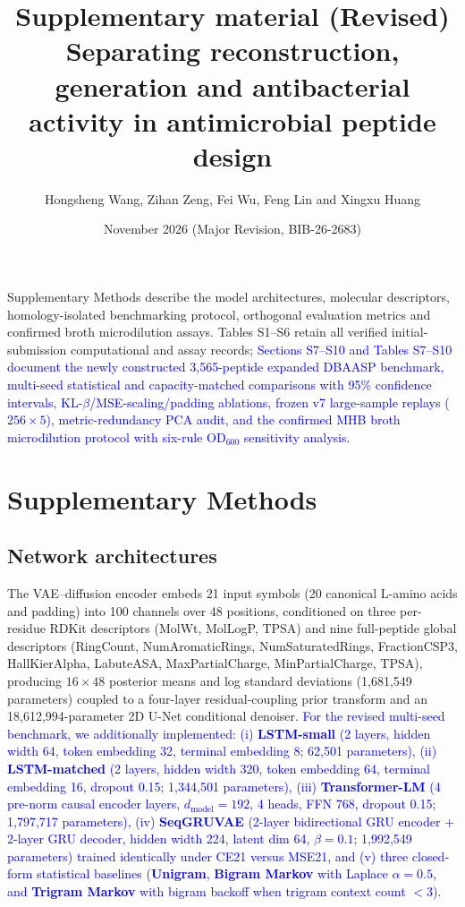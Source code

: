 \documentclass[11pt,a4paper]{article}
\title{Supplementary material (Revised)\\[5pt]\large Separating reconstruction, generation and antibacterial activity in antimicrobial peptide design}
\author{Hongsheng Wang, Zihan Zeng, Fei Wu, Feng Lin and Xingxu Huang}
\date{November 2026 (Major Revision, BIB-26-2683)}
\newcommand{\rev}[1]{\textcolor{blue}{#1}}
\begin{document}
\maketitle\thispagestyle{fancy}
Supplementary Methods describe the model architectures, molecular descriptors, homology-isolated benchmarking protocol, orthogonal evaluation metrics and confirmed broth microdilution assays. Tables S1--S6 retain all verified initial-submission computational and assay records; \rev{Sections S7--S10 and Tables S7--S10 document the newly constructed 3,565-peptide expanded DBAASP benchmark, multi-seed statistical and capacity-matched comparisons with 95\% confidence intervals, KL-$\beta$/MSE-scaling/padding ablations, frozen v7 large-sample replays ($256\times 5$), metric-redundancy PCA audit, and the confirmed MHB broth microdilution protocol with six-rule OD$_{600}$ sensitivity analysis.}

\section*{Supplementary Methods}
\subsection*{Network architectures}
The VAE--diffusion encoder embeds 21 input symbols (20 canonical L-amino acids and padding) into 100 channels over 48 positions, conditioned on three per-residue RDKit descriptors (MolWt, MolLogP, TPSA) and nine full-peptide global descriptors (RingCount, NumAromaticRings, NumSaturatedRings, FractionCSP3, HallKierAlpha, LabuteASA, MaxPartialCharge, MinPartialCharge, TPSA), producing $16\times 48$ posterior means and log standard deviations (1,681,549 parameters) coupled to a four-layer residual-coupling prior transform and an 18,612,994-parameter 2D U-Net conditional denoiser. \rev{For the revised multi-seed benchmark, we additionally implemented: (i) \textbf{LSTM-small} (2 layers, hidden width 64, token embedding 32, terminal embedding 8; 62,501 parameters), (ii) \textbf{LSTM-matched} (2 layers, hidden width 320, token embedding 64, terminal embedding 16, dropout 0.15; 1,344,501 parameters), (iii) \textbf{Transformer-LM} (4 pre-norm causal encoder layers, $d_{\mathrm{model}}=192$, 4 heads, FFN 768, dropout 0.15; 1,797,717 parameters), (iv) \textbf{SeqGRUVAE} (2-layer bidirectional GRU encoder + 2-layer GRU decoder, hidden width 224, latent dim 64, $\beta=0.1$; 1,992,549 parameters) trained identically under CE21 versus MSE21, and (v) three closed-form statistical baselines (\textbf{Unigram}, \textbf{Bigram Markov} with Laplace $\alpha=0.5$, and \textbf{Trigram Markov} with bigram backoff when trigram context count $<3$).}
\end{document}
